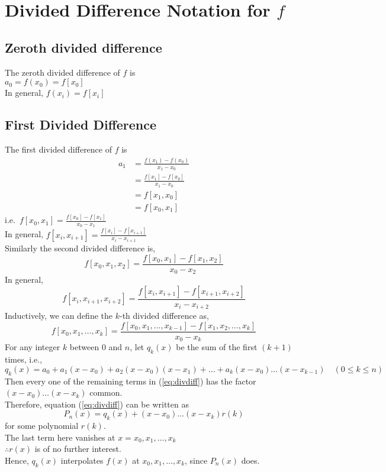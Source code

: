 \documentclass[12pt,class=book,crop=false]{standalone}
\begin{document}
\section{Divided Difference Notation for \(  f \)}
\subsection{Zeroth divided difference}
The zeroth divided difference of \(  f \) is \\
\indent \(  a_0=f(x_0)=f[x_0] \)\\


In general, \(  f(x_i)=f[x_i] \)
\subsection{First Divided Difference}
The first divided difference of \(  f \) is
\begin{align*}
    a_1 & =\frac{f(x_1)-f(x_0)}{x_1-x_0} \\
        & =\frac{f[x_1]-f[x_0]}{x_1-x_0} \\
        & = f[x_1,x_0]                   \\
        & = f[x_0,x_1]
\end{align*}
i.e.\ \(  f[x_0,x_1]=\frac{f[x_0]-f[x_1]}{x_0-x_1} \)\\
In general,  \(  f[x_i,x_{i+1}]=\frac{f[x_i]-f[x_{i+1}]}{x_i-x_{i+1}} \)\\
Similarly the second divided difference is,
\[
    f[x_0,x_1,x_2]=\frac{f[x_0,x_1]-f[x_1,x_2]}{x_0-x_2}
\]
In general,
\[
    f[x_i,x_{i+1},x_{i+2}]=\frac{f[x_i,x_{i+1}]-f[x_{i+1},x_{i+2}]}{x_i-x_{i+2}}
\]
Inductively, we can define the \(  k \)-th divided difference as,
\[
    f[x_0,x_1,\dots,x_k]=\frac{f[x_0,x_1,\dots,x_{k-1}]-f[x_1,x_2,\dots,x_k]}{x_0-x_k}
\]
For any integer \(  k \) between \(  0 \) and \(  n \), let \(  q_k(x) \) be the sum of the first \(  (k+1) \) times, i.e.,
\[q_k(x)=a_0+a_1(x-x_0)+a_2(x-x_0)(x-x_1)+\dots+a_k(x-x_0)\dots(x-x_{k-1}) \quad(0\leq k\leq n)\]
Then every one of the remaining terms in (\ref{eq:divdiff}) has the factor \(  (x-x_0)\dots(x-x_k) \) common.\\
Therefore, equation (\ref{eq:divdiff}) can be written as
\[P_n(x)=q_k(x)+(x-x_0)\dots(x-x_k)r(k)\]
for some polynomial \(  r(k) \).\\
The last term here vanishes at \(  x=x_0,x_1,\dots,x_k \)\\
\(  \therefore r(x) \) is of no further interest.\\
Hence, \(  q_k(x) \) interpolates \(  f(x) \) at \(  x_0,x_1,\dots,x_k  \), since \(  P_n(x) \) does.\\
\end{document}
